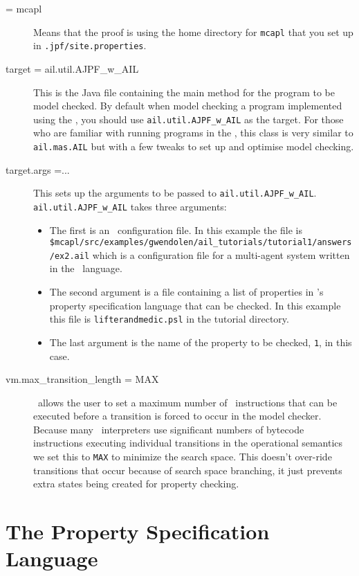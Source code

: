 \documentclass[a4]{article}
\begin{document}
\begin{description}
\item[\@using = mcapl] Means that the proof is using the home directory for \texttt{mcapl} that you set up in \texttt{.jpf/site.properties}.
\item[target = ail.util.AJPF\_w\_AIL] This is the Java file containing the main method for the program to be model checked.  By default when model checking a program implemented using the \ail, you should use \texttt{ail.util.AJPF\_w\_AIL} as the target.  For those who are familiar with running programs in the \ail, this class is very similar to \texttt{ail.mas.AIL} but with a few tweaks to set up and optimise model checking.
\item[target.args =...] This sets up the arguments to be passed to \texttt{ail.util.AJPF\_w\_AIL}.  \texttt{ail.util.AJPF\_w\_AIL} takes three arguments:
\begin{itemize}
\item The first is an \ail\ configuration file.  In this example the file is \texttt{\${mcapl}/src/examples/gwendolen/ail_tutorials/tutorial1/answers/ex2.ail} which is a configuration file for a multi-agent system written in the \gwendolen\ language.
\item The second argument is a file containing a list of properties in \ajpf's property specification language that can be checked.  In this example this file is \texttt{lifterandmedic.psl} in the tutorial directory.
\item The last argument is the name of the property to be checked, \texttt{1}, in this case.
\end{itemize}
\item[vm.max_transition_length = MAX] \jpf\ allows the user to set a maximum number of \java\ instructions that can be executed before a transition is forced to occur in the model checker.  Because many \ail\ interpreters use significant numbers of bytecode instructions executing individual transitions in the operational semantics we set this to \texttt{MAX} to minimize the search space.  This doesn't over-ride transitions that occur because of search space branching, it just prevents extra states being created for property checking.
\end{description}

\section{The Property Specification Language}
\end{document}

